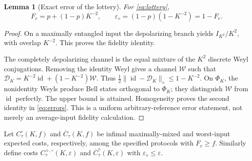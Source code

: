 \documentclass[11pt]{article}
\newtheorem{lemma}[theorem]{Lemma}
\newcommand{\id}{\operatorname{id}}
\newcommand{\norm}[1]{\lVert #1\rVert}
\newcommand{\cD}{\mathcal D}
\newcommand{\Ph}{\Phi_K}
\begin{document}
\begin{lemma}[Exact error of the lottery]\label{lem:lotteryerror}
For \eqref{eq:lottery},
\begin{equation}
 F_e=p+(1-p)K^{-2},\qquad
 \varepsilon_\diamond=(1-p)(1-K^{-2})=1-F_e.\label{eq:errors}
\end{equation}
\end{lemma}
\begin{proof}
On a maximally entangled input the depolarizing branch yields $I_{K^2}/K^2$, with overlap $K^{-2}$. This proves the fidelity identity.

The completely depolarizing channel is the equal mixture of the $K^2$ discrete Weyl conjugations. Removing the identity Weyl gives a channel $\mathcal W$ such that $\cD_K=K^{-2}\id+(1-K^{-2})\mathcal W$. Thus
$\tfrac12\norm{\id-\cD_K}_\diamond\le1-K^{-2}$.
On $\Ph$, the nonidentity Weyls produce Bell states orthogonal to $\Ph$; they distinguish $\mathcal W$ from $\id$ perfectly. The upper bound is attained. Homogeneity proves the second identity in \eqref{eq:errors}. This is a uniform arbitrary-reference error statement, not merely an average-input fidelity calculation.
\end{proof}

Let $C_\tau^\circ(K,f)$ and $\overline C_\tau(K,f)$ be infimal maximally-mixed and worst-input expected costs, respectively, among the specified protocols with $F_e\ge f$. Similarly define costs $C_\tau^{\diamond,\circ}(K,\varepsilon)$ and $\overline C_\tau^\diamond(K,\varepsilon)$ with $\varepsilon_\diamond\le\varepsilon$.
\end{document}
